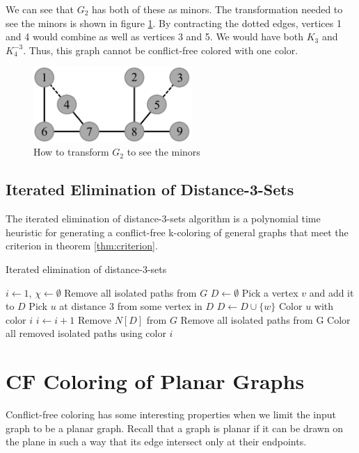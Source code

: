 \documentclass{sig-alternate}
\begin{document}
We can see that $G_2$ has both of these as minors. The transformation needed to see the minors is shown in figure \ref{fig:criterion-minor}. By contracting the dotted edges, vertices 1 and 4 would combine as well as vertices 3 and 5. We would have both $K_{3}$ and $K_{4}^{-3}$. Thus, this graph cannot be conflict-free colored with one color.

\begin{figure}[h]
	\centering
	\includegraphics[width=6cm]{../figures/criterion-minor.pdf}
	\caption{How to transform $G_2$ to see the minors}\label{fig:criterion-minor}
\end{figure}

\subsection{Iterated Elimination of Distance-3-Sets}
The iterated elimination of distance-3-sets algorithm is a polynomial time heuristic for generating a conflict-free k-coloring of general graphs that meet the criterion in theorem \ref{thm:criterion}.

\begin{algorithm}
\caption{Iterated elimination of distance-3-sets} \label{alg:elimination}
\begin{algorithmic}[1]
\State $i \gets 1$, $\chi \gets \emptyset$
\State Remove all isolated paths from $G$
	\State $D \gets \emptyset$
		\State Pick a vertex $v$ and add it to $D$
			\State Pick $u$ at distance 3 from some vertex in $D$
			\State $D \gets D \cup \{ w \}$
		\EndWhile
			\State Color $u$ with color $i$
		\EndFor
		\State $i \gets i + 1$
		\State Remove $N[D]$ from $G$
		\State Remove all isolated paths from G
	\EndFor
\EndWhile
\State Color all removed isolated paths using color $i$
\end{algorithmic}
\end{algorithm}


\section{CF Coloring of Planar Graphs}
Conflict-free coloring has some interesting properties when we limit the input graph to be a planar graph. Recall that a graph is planar if it can be drawn on the plane in such a way that its edge intersect only at their endpoints.
\end{document}

